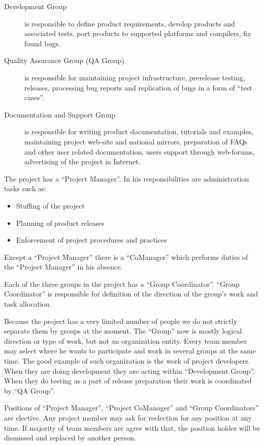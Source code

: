 \documentclass[a4paper,12pt,oneside]{book}
\begin{document}
\begin{description}
  \item [Development Group] is responsible to define product requirements, develop products and associated tests, port products to supported platforms and compilers, fix found bugs.
	\item [Quality Assurance Group (QA Group)] is responsible for maintaining project infrastructure, prerelease testing, releases, processing bug reports and replication of bugs in a form of “test cases”.
	\item [Documentation and Support Group] is responsible for writing product documentation, tutorials and examples, maintaining project web-site and national mirrors, preparation of FAQs and other user related documentation, users support through web-forums, advertising of the project in Internet.
\end{description}

The project has a “Project Manager”. In his responsibilities are administration tasks such as:
\begin{itemize}
  \item Stuffing of the project
	\item Planning of product releases
	\item Enforcement of project procedures and practices
\end{itemize}

Except a “Project Manager” there is a “CoManager” which performs duties of the “Project Manager” in his absence.

Each of the three groups in the project has a “Group Coordinator”.
“Group Coordinator” is responsible for definition of the direction of the group’s work and task allocation.

Because the project has a very limited number of people we do not strictly separate them by groups at the moment.
The “Group” now is mostly logical direction or type of work, but not an organization entity.
Every team member may select where he wants to participate and work in several groups at the same time.
The good example of such organization is the work of project developers.
When they are doing development they are acting within “Development Group”.
When they do testing as a part of release preparation their work is coordinated by “QA Group”.

Positions of “Project Manager”, “Project CoManager” and “Group Coordinators” are elective.
Any project member may ask for reelection for any position at any time.
If majority of team members are agree with that, the position holder will be dismissed and replaced by another person.
\end{document}
